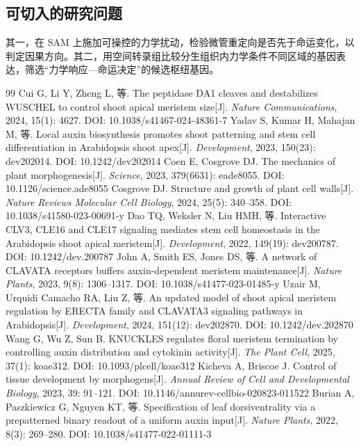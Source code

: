 \documentclass[11pt,a4paper]{ctexart}
\begin{document}
\subsection{可切入的研究问题}

其一，在 SAM 上施加可操控的力学扰动，检验微管重定向是否先于命运变化，以判定因果方向。其二，用空间转录组比较分生组织内力学条件不同区域的基因表达，筛选“力学响应—命运决定”的候选枢纽基因。



\begin{thebibliography}{99}
\small
{} Cui G, Li Y, Zheng L, 等. The peptidase DA1 cleaves and destabilizes WUSCHEL to control shoot apical meristem size[J]. \textit{Nature Communications}, 2024, 15(1): 4627. DOI: 10.1038/s41467-024-48361-7
 Yadav S, Kumar H, Mahajan M, 等. Local auxin biosynthesis promotes shoot patterning and stem cell differentiation in Arabidopsis shoot apex[J]. \textit{Development}, 2023, 150(23): dev202014. DOI: 10.1242/dev202014
 Coen E, Cosgrove DJ. The mechanics of plant morphogenesis[J]. \textit{Science}, 2023, 379(6631): eade8055. DOI: 10.1126/science.ade8055
 Cosgrove DJ. Structure and growth of plant cell walls[J]. \textit{Nature Reviews Molecular Cell Biology}, 2024, 25(5): 340–358. DOI: 10.1038/s41580-023-00691-y
 Dao TQ, Weksler N, Liu HMH, 等. Interactive CLV3, CLE16 and CLE17 signaling mediates stem cell homeostasis in the Arabidopsis shoot apical meristem[J]. \textit{Development}, 2022, 149(19): dev200787. DOI: 10.1242/dev.200787
 John A, Smith ES, Jones DS, 等. A network of CLAVATA receptors buffers auxin-dependent meristem maintenance[J]. \textit{Nature Plants}, 2023, 9(8): 1306–1317. DOI: 10.1038/s41477-023-01485-y
 Uzair M, Urquidi Camacho RA, Liu Z, 等. An updated model of shoot apical meristem regulation by ERECTA family and CLAVATA3 signaling pathways in Arabidopsis[J]. \textit{Development}, 2024, 151(12): dev202870. DOI: 10.1242/dev.202870
 Wang G, Wu Z, Sun B. KNUCKLES regulates floral meristem termination by controlling auxin distribution and cytokinin activity[J]. \textit{The Plant Cell}, 2025, 37(1): koae312. DOI: 10.1093/plcell/koae312
 Kicheva A, Briscoe J. Control of tissue development by morphogens[J]. \textit{Annual Review of Cell and Developmental Biology}, 2023, 39: 91–121. DOI: 10.1146/annurev-cellbio-020823-011522
 Burian A, Paszkiewicz G, Nguyen KT, 等. Specification of leaf dorsiventrality via a prepatterned binary readout of a uniform auxin input[J]. \textit{Nature Plants}, 2022, 8(3): 269–280. DOI: 10.1038/s41477-022-01111-3

\end{thebibliography}
\end{document}
